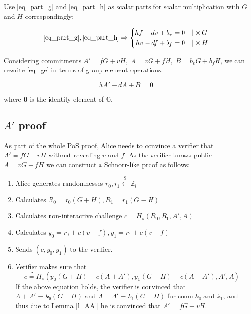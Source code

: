 \documentclass{article}
\numberwithin{figure}{section}
\begin{document}
Use \eqref{eq_part_g} and \eqref{eq_part_h} as scalar parts for scalar multiplication with $G$ and $H$ correspondingly:

\begin{equation} \label{eq_ge}
\eqref{eq_part_g}, \eqref{eq_part_h} \Rightarrow
\left\{ \begin{aligned} 
  h f - d v + b_v &= 0 \quad | \times G \\
  h v - d f + b_f &= 0 \quad | \times H
\end{aligned} \right.
\end{equation}

Considering commitments $A'=fG+vH, \; A=vG+fH, \; B=b_v G + b_f H$, we can rewrite \eqref{eq_ge} in terms of group element operations: 

\begin{equation} 
    hA'-dA+B=\mathbf{0} \label{eq_ge_fin}
\end{equation}

where $\mathbf{0}$ is the identity element of $\mathbb{G}$.


\subsection{$A'$ proof} \label{a_prime_proof}

As part of the whole PoS proof, Alice needs to convince a verifier that $A' = fG + vH$ without revealing $v$ and $f$. As the verifier knows public $A = vG + fH$ we can construct a Schnorr-like proof as follows:

\begin{enumerate}
    \item Alice generates randomnesses $r_0, r_1 \stackrel{\$}{\leftarrow} \mathbb{Z}_l$ 
    
    \item Calculates $R_0 = r_0 (G + H), R_1 = r_1 (G - H)$
    
    \item Calculates non-interactive challenge $c = H_s(R_0, R_1, A', A)$
    
    \item Calculates $y_0 = r_0 + c(v+f), y_1 = r_1 + c(v-f)$
    
    \item Sends $(c, y_0, y_1)$ to the verifier.

    \item Verifier makes sure that
    \[ c \stackrel{?}{=} H_s(y_0(G+H)-c(A+A'), y_1(G-H)-c(A-A'), A', A)\]
    If the above equation holds, the verifier is convinced that $A+A'=k_0(G+H)$ and $A-A'=k_1(G-H)$ for some $k_0$ and $k_1$, and thus due to Lemma \ref{l_AA'} he is convinced that  $A' = fG + vH$.
\end{enumerate}
\end{document}
